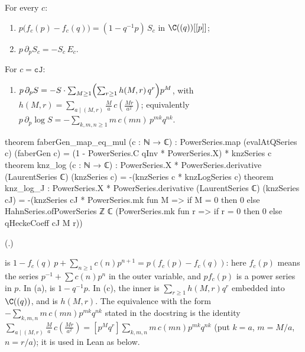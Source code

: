 \begin{theorem}\label{ch19:thm:knzlog}
For every $c$:
\begin{enumerate}[label=(\alph*)]
\item $p\bigl(f_c(p)-f_c(q)\bigr)=(1-q^{-1}p)\,S_c$ in $\C((q))[[p]]$;
\item $p\,\partial_pS_c=-S_c\,E_c$.
\end{enumerate}
For $c=\mathtt{cJ}$:
\begin{enumerate}[label=(\alph*),resume]
\item $p\,\partial_pS=-S\cdot\sum_{M\ge1}\Bigl(\sum_{r\ge1}h(M,r)\,q^r\Bigr)p^M$, with $h(M,r)=\sum_{a\mid(M,r)}\frac Ma\,c(\frac{Mr}{a^2})$;
  equivalently $p\,\partial_p\log S=-\sum_{k,m,n\ge1}m\,c(mn)\,p^{mk}q^{nk}$.
\end{enumerate}
\end{theorem}
\begin{leancode}
theorem faberGen_map_eq_mul (c : ℕ → ℂ) :
    PowerSeries.map (evalAtQSeries c) (faberGen c) =
      (1 - PowerSeries.C qInv * PowerSeries.X) * knzSeries c
theorem knz_log (c : ℕ → ℂ) :
    PowerSeries.X * PowerSeries.derivative (LaurentSeries ℂ) (knzSeries c) =
      -(knzSeries c * knzLogSeries c)
theorem knz_log_J :
    PowerSeries.X * PowerSeries.derivative (LaurentSeries ℂ) (knzSeries cJ) =
      -(knzSeries cJ * PowerSeries.mk fun M => if M = 0 then 0 else
        HahnSeries.ofPowerSeries ℤ ℂ
          (PowerSeries.mk fun r => if r = 0 then 0 else qHeckeCoeff cJ M r))
\end{leancode}
(.)
\begin{dictionary}
 is $1-f_c(q)\,p+\sum_{n\ge1}c(n)p^{n+1}=p(f_c(p)-f_c(q))$: here
$f_c(p)$ means the series $p^{-1}+\sum c(n)p^n$ in the outer variable, and $pf_c(p)$ is a power series in $p$.  In
(a),  is $1-q^{-1}p$.  In (c), the inner 
is $\sum_{r\ge1}h(M,r)q^r$ embedded into $\C((q))$, and  is $h(M,r)$.  The equivalence with
the form $-\sum_{k,m,n}m\,c(mn)p^{mk}q^{nk}$ stated in the docstring is the identity
$\sum_{a\mid(M,r)}\frac Ma\,c(\frac{Mr}{a^2})=[p^Mq^r]\sum_{k,m,n}m\,c(mn)p^{mk}q^{nk}$ (put $k=a$, $m=M/a$, $n=r/a$); it is
used in Lean as  below.
\end{dictionary}
